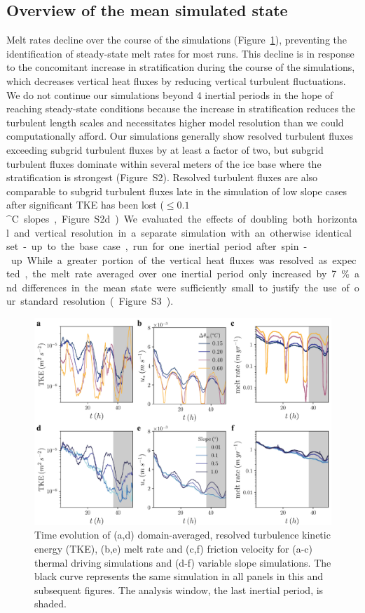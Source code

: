 \documentclass[tc, manuscript]{copernicus}
\begin{document}
\subsection{Overview of the mean simulated state}
Melt rates decline over the course of the simulations (Figure~\ref{fig:timeseries}), preventing the identification of steady-state melt rates for most runs. This decline is in response to the concomitant increase in stratification during the course of the simulations, which decreases vertical heat fluxes by reducing vertical turbulent fluctuations. We do not continue our simulations beyond 4 inertial periods in the hope of reaching steady-state conditions because the increase in stratification reduces the turbulent length scales and necessitates higher model resolution than we could computationally afford. Our simulations generally show resolved turbulent fluxes exceeding subgrid turbulent fluxes by at least a factor of two, but subgrid turbulent fluxes dominate within several meters of the ice base where the stratification is strongest (Figure~S2). Resolved turbulent fluxes are also comparable to subgrid turbulent fluxes late in the simulation of low slope cases after significant TKE has been lost ($\leq\!0.1$\unit{^{\circ}C} slopes, Figure~S2d). We evaluated the effects of doubling both horizontal and vertical resolution in a separate simulation with an otherwise identical set-up to the base case, run for one inertial period after spin-up. While a greater portion of the vertical heat fluxes was resolved as expected, the melt rate averaged over one inertial period only increased by 7\% and differences in the mean state were sufficiently small to justify the use of our standard resolution (Figure~S3).

\begin{figure}[t]
\includegraphics[width=12cm]{fig1.pdf}
\caption{Time evolution of (a,d) domain-averaged, resolved turbulence kinetic energy (TKE), (b,e) melt rate and (c,f) friction velocity for (a-c) thermal driving simulations and (d-f) variable slope simulations. The black curve represents the same simulation in all panels in this and subsequent figures. The analysis window, the last inertial period, is shaded.}
\label{fig:timeseries}
\end{figure}
\end{document}
